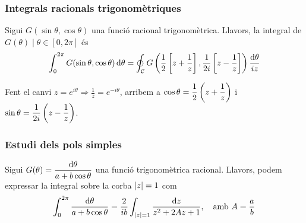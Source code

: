 \subsubsection*{Integrals racionals trigonomètriques}
Sigui $G(\sin \theta, \cos \theta)$ una funció racional trigonomètrica. Llavors, la integral de $G(\theta) \mid \theta \in [0,2\pi]$ és
\begin{align}
    \int_{0}^{2\pi} G(\sin \theta, \cos \theta) \mathop{}\!\mathrm{d} \theta = \oint_{\mathcal{C}} G\left( \frac{1}{2}\left[ z + \frac{1}{z} \right], \frac{1}{2i}\left[ z - \frac{1}{z} \right] \right) \frac{\mathrm{d} \theta}{iz}
\end{align}
\begin{sproof}
    Fent el canvi $z = e^{i\theta} \Rightarrow \displaystyle \frac{1}{z} = e^{-i\theta}$, arribem a $\displaystyle \cos \theta = \frac{1}{2}\left( z + \frac{1}{z} \right)$ i $\displaystyle \sin \theta = \frac{1}{2i}\left( z - \frac{1}{z} \right)$.
\end{sproof}

\subsubsection*{Estudi dels pols simples}
Sigui $G(\theta) = \dfrac{\mathrm{d} \theta}{a + b \cos \theta}$ una funció trigonomètrica racional. Llavors, podem expressar la integral sobre la corba $\left| z \right| = 1$ com
\begin{align}
    \int_{0}^{2\pi} \frac{\mathrm{d} \theta}{a + b \cos \theta} = \frac{2}{ib} \int_{\left| z \right| = 1} \frac{\mathrm{d} z}{z^{2} + 2Az + 1}, \quad \text{amb } A = \frac{a}{b}
\end{align}

